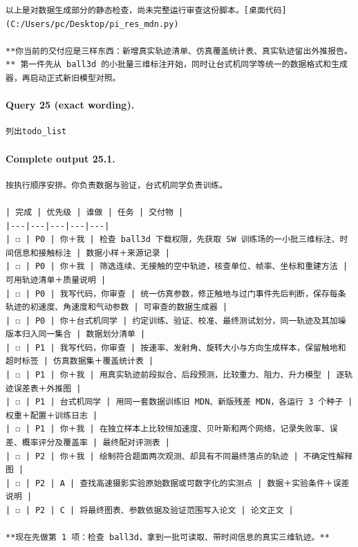 \documentclass[UTF8,10pt]{ctexart}
\begin{document}
\begin{Verbatim}[breaklines=true,breakanywhere=true,fontsize=\scriptsize,frame=single,framesep=2pt]
以上是对数据生成部分的静态检查，尚未完整运行审查这份脚本。[桌面代码](C:/Users/pc/Desktop/pi_res_mdn.py)

**你当前的交付应是三样东西：新增真实轨迹清单、仿真覆盖统计表、真实轨迹留出外推报告。** 第一件先从 ball3d 的小批量三维标注开始，同时让台式机同学等统一的数据格式和生成器，再启动正式新旧模型对照。
\end{Verbatim}

\paragraph{Query 25 (exact wording).}
\begin{Verbatim}[breaklines=true,breakanywhere=true,fontsize=\scriptsize,frame=single,framesep=2pt]
列出todo_list
\end{Verbatim}

\paragraph{Complete output 25.1.}
\begin{Verbatim}[breaklines=true,breakanywhere=true,fontsize=\scriptsize,frame=single,framesep=2pt]
按执行顺序安排。你负责数据与验证，台式机同学负责训练。

| 完成 | 优先级 | 谁做 | 任务 | 交付物 |
|---|---|---|---|---|
| ☐ | P0 | 你＋我 | 检查 ball3d 下载权限，先获取 SW 训练场的一小批三维标注、时间信息和接触标注 | 数据小样＋来源记录 |
| ☐ | P0 | 你＋我 | 筛选连续、无接触的空中轨迹，核查单位、帧率、坐标和重建方法 | 可用轨迹清单＋质量说明 |
| ☐ | P0 | 我写代码，你审查 | 统一仿真参数，修正触地与过门事件先后判断，保存每条轨迹的初速度、角速度和气动参数 | 可审查的数据生成器 |
| ☐ | P0 | 你＋台式机同学 | 约定训练、验证、校准、最终测试划分，同一轨迹及其加噪版本归入同一集合 | 数据划分清单 |
| ☐ | P1 | 我写代码，你审查 | 按速率、发射角、旋转大小与方向生成样本，保留触地和超时标签 | 仿真数据集＋覆盖统计表 |
| ☐ | P1 | 你＋我 | 用真实轨迹前段拟合、后段预测，比较重力、阻力、升力模型 | 逐轨迹误差表＋外推图 |
| ☐ | P1 | 台式机同学 | 用同一套数据训练旧 MDN、新版残差 MDN，各运行 3 个种子 | 权重＋配置＋训练日志 |
| ☐ | P1 | 你＋我 | 在独立样本上比较恒加速度、贝叶斯和两个网络，记录失败率、误差、概率评分及覆盖率 | 最终配对评测表 |
| ☐ | P2 | 你＋我 | 绘制符合题面两次观测、却具有不同最终落点的轨迹 | 不确定性解释图 |
| ☐ | P2 | A | 查找高速摄影实验原始数据或可数字化的实测点 | 数据＋实验条件＋误差说明 |
| ☐ | P2 | C | 将最终图表、参数依据及验证范围写入论文 | 论文正文 |

**现在先做第 1 项：检查 ball3d，拿到一批可读取、带时间信息的真实三维轨迹。**
\end{Verbatim}
\end{document}
